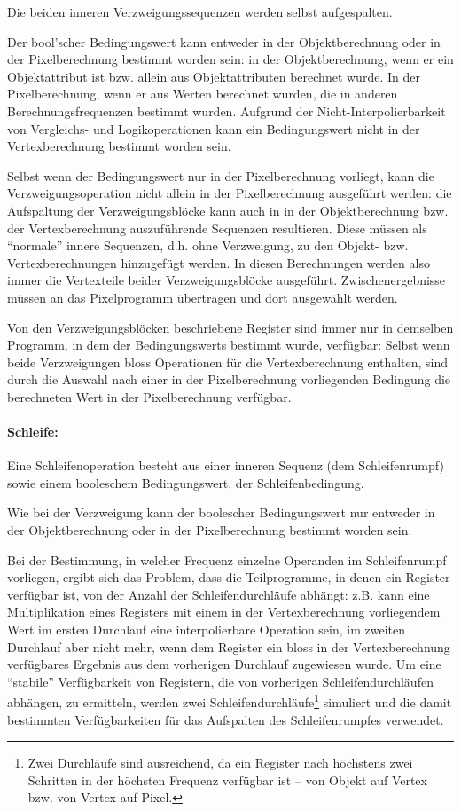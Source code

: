 \documentclass[twoside,a4paper,fleqn,12pt]{book}
\begin{document}
Die beiden inneren Verzweigungssequenzen werden selbst aufgespalten.

Der bool'scher Bedingungswert kann entweder in der Objektberechnung oder in der Pixelberechnung bestimmt worden sein:
in der Objektberechnung, wenn er ein Objektattribut ist bzw. allein aus
Objektattributen berechnet wurde. In der Pixelberechnung, wenn er aus Werten berechnet wurden, die in anderen Berechnungsfrequenzen bestimmt wurden.
Aufgrund der Nicht-Interpolierbarkeit von Vergleichs- und Logikoperationen kann ein Bedingungswert nicht in der Vertexberechnung bestimmt worden sein.

Selbst wenn der Bedingungswert nur in der Pixelberechnung vorliegt, kann die Verzweigungsoperation nicht allein in der Pixelberechnung ausgeführt werden:
die Aufspaltung der Verzweigungsblöcke kann auch in in der Objektberechnung bzw. der Vertexberechnung auszuführende Sequenzen resultieren. Diese müssen als "`normale"'
innere Sequenzen, d.h. ohne Verzweigung, zu den Objekt- bzw. Vertexberechnungen hinzugefügt werden. In diesen Berechnungen werden also immer
die Vertexteile beider Verzweigungsblöcke ausgeführt. Zwischenergebnisse müssen an das Pixelprogramm übertragen und dort ausgewählt werden.

Von den Verzweigungsblöcken beschriebene Register sind immer nur in demselben Programm, in dem der Bedingungswerts bestimmt wurde, verfügbar:
Selbst wenn beide Verzweigungen bloss Operationen für die Vertexberechnung enthalten, sind durch die Auswahl nach einer in der Pixelberechnung vorliegenden Bedingung
die berechneten Wert in der Pixelberechnung verfügbar.

\paragraph{Schleife:} Eine Schleifenoperation besteht aus einer inneren Sequenz (dem Schleifenrumpf) sowie
einem booleschem Bedingungswert, der Schleifenbedingung.

Wie bei der Verzweigung kann der boolescher Bedingungswert nur entweder in der Objektberechnung oder in der Pixelberechnung bestimmt worden sein.

Bei der Bestimmung, in welcher Frequenz einzelne Operanden im Schleifenrumpf vorliegen,
ergibt sich das Problem, dass die Teilprogramme, in denen ein Register verfügbar ist, von der Anzahl der Schleifendurchläufe
abhängt: z.B. kann eine Multiplikation eines Registers mit einem in der Vertexberechnung vorliegendem Wert im ersten Durchlauf
eine interpolierbare Operation sein, im zweiten Durchlauf aber nicht mehr, wenn dem Register ein bloss in der Vertexberechnung 
verfügbares Ergebnis aus dem vorherigen Durchlauf zugewiesen wurde.
Um eine "`stabile"' Verfügbarkeit von Registern, die von vorherigen Schleifendurchläufen abhängen, zu ermitteln,
werden zwei Schleifendurchläufe\footnote{Zwei Durchläufe sind ausreichend, da ein Register
nach höchstens zwei Schritten in der höchsten Frequenz verfügbar ist -- von Objekt auf Vertex bzw. von Vertex auf Pixel.}
simuliert und die damit bestimmten Verfügbarkeiten für das Aufspalten des Schleifenrumpfes verwendet.
\end{document}
